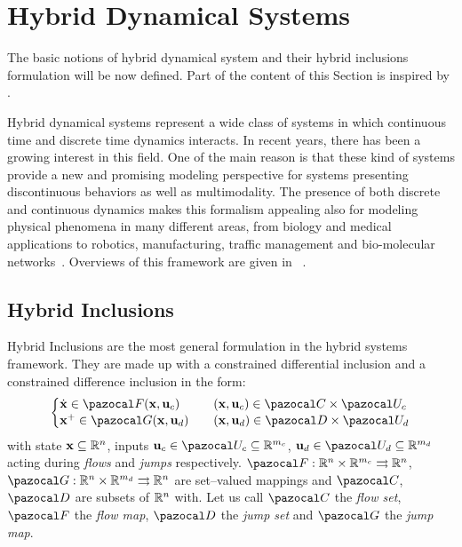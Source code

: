 \section{Hybrid Dynamical Systems\label{sec:HD_systems}}
%
The basic notions of hybrid dynamical system and their hybrid inclusions formulation will be now defined. Part of the content of this Section is inspired by \cite{goebel2009hybrid,Goebel2012}.

Hybrid dynamical systems represent a wide class of systems in which continuous time and discrete time dynamics interacts. In recent years, there has been a growing interest in this field. One of the main reason is that these kind of systems provide a new and promising modeling perspective for systems presenting discontinuous behaviors as well as multimodality. The presence of both discrete and continuous dynamics makes this formalism appealing also for modeling physical phenomena in many different areas, from biology and medical applications to robotics, manufacturing, traffic management and bio-molecular networks~\citep{Aihara4893, Bortolussi2018}. 
Overviews of this framework are given in ~\citep{van2000introduction, haddad2006impulsive,goebel2009hybrid,Goebel2012}.
%
\subsection{Hybrid Inclusions}
%
Hybrid Inclusions are the most general formulation in the hybrid systems framework. They are made up with a constrained differential inclusion and a constrained difference inclusion in the form:
\begin{equation}\label{eq:hs}
%
\left\{ 
\begin{matrix*}[l]\vspace{1pt}
%
\dot{\xb} \in \F(\xb,\ub_c) &&(\xb,\ub_c)\in\C\times\U_c\\
\xb^+ \in \G(\xb,\ub_d)&&(\xb,\ub_d)\in\D\times\U_d
%
\end{matrix*}
\right.
%
\end{equation}
%
with state $\mathbf{x}\subseteq\mathbb{R}^n$, inputs $\ub_c\in\U_c\subseteq\R^{m_c}$, $\ub_d\in\U_d\subseteq\R^{m_d}$ acting during \textit{flows} and \textit{jumps} respectively. ${\F}:\R^n\times\R^{m_c}\rightrightarrows\R^n$, $\G:\R^n\times\R^{m_d}\rightrightarrows\R^n$ are set--valued mappings and $\C$, $\D$ are subsets of $\mathbb{R}^n$ with. Let us call $\C$ the \textit{flow set}, $\F$ the \textit{flow map}, $\D$ the \textit{jump set} and $\G $ the \textit{jump map}.
%
\newline

